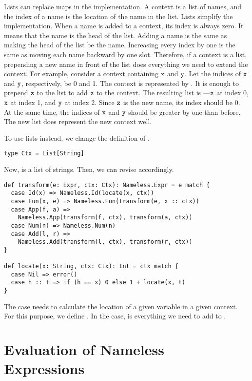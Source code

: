 Lists can replace maps in the implementation. A context is a list of names, and
the index of a name is the location of the name in the list. Lists simplify the
implementation. When a name is added to a context, its index is always zero. It
means that the name is the head of the list. Adding a name is the same as making
the head of the list be the name. Increasing every index by one is the same as
moving each name backward by one slot. Therefore, if a context is a list,
prepending a new name in front of the list does everything we need to extend
the context. For
example, consider a context containing $\texttt{x}$ and $\texttt{y}$. Let the indices of
$\texttt{x}$ and $\texttt{y}$, respectively, be 0 and 1. The context is represented by
. It is enough to prepend $\texttt{z}$ to the list to add
$\texttt{z}$ to the context. The resulting list is ---$\texttt{z}$ at
index 0, $\texttt{x}$ at index 1, and $\texttt{y}$ at index 2. Since $\texttt{z}$ is the new
name, its index should be 0. At the same time, the indices of $\texttt{x}$ and $\texttt{y}$
should be greater by one than before. The new list does represent the new context
well.

To use lists instead, we change the definition of .

\begin{verbatim}
type Ctx = List[String]
\end{verbatim}

Now,  is a list of strings. Then, we can revise 
accordingly.

\begin{verbatim}
def transform(e: Expr, ctx: Ctx): Nameless.Expr = e match {
  case Id(x) => Nameless.Id(locate(x, ctx))
  case Fun(x, e) => Nameless.Fun(transform(e, x :: ctx))
  case App(f, a) =>
    Nameless.App(transform(f, ctx), transform(a, ctx))
  case Num(n) => Nameless.Num(n)
  case Add(l, r) =>
    Nameless.Add(transform(l, ctx), transform(r, ctx))
}

def locate(x: String, ctx: Ctx): Int = ctx match {
  case Nil => error()
  case h :: t => if (h == x) 0 else 1 + locate(x, t)
}
\end{verbatim}

The  case needs to calculate the location of a given variable in a
given context. For this purpose, we define . In the 
case,  is everything we need to add  to .

\section{Evaluation of Nameless Expressions}

